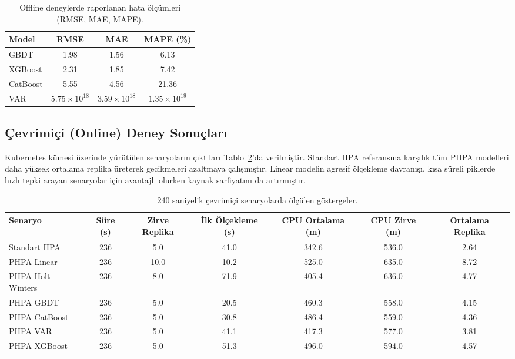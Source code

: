 \documentclass[12pt,a4paper]{article}
\begin{document}
\begin{table}[h]
    \centering
    \caption{Offline deneylerde raporlanan hata ölçümleri (RMSE, MAE, MAPE).}
    \label{tab:offline}
    \begin{tabular}{@{}lccc@{}}
        \toprule
        Model & RMSE & MAE & MAPE (\%) \\
        \midrule
        GBDT & 1.98 & 1.56 & 6.13 \\
        XGBoost & 2.31 & 1.85 & 7.42 \\
        CatBoost & 5.55 & 4.56 & 21.36 \\
        VAR & $5.75\times10^{18}$ & $3.59\times10^{18}$ & $1.35\times10^{19}$ \\
        \bottomrule
    \end{tabular}
\end{table}

\subsection{Çevrimiçi (Online) Deney Sonuçları}
Kubernetes kümesi üzerinde yürütülen senaryoların çıktıları Tablo~\ref{tab:online}’da verilmiştir. Standart HPA referansına karşılık tüm PHPA modelleri daha yüksek ortalama replika üreterek gecikmeleri azaltmaya çalışmıştır. Linear modelin agresif ölçekleme davranışı, kısa süreli piklerde hızlı tepki arayan senaryolar için avantajlı olurken kaynak sarfiyatını da artırmıştır.

\begin{table}[h]
    \centering
    \caption{240 saniyelik çevrimiçi senaryolarda ölçülen göstergeler.}
    \label{tab:online}
    \begin{tabular}{@{}lcccccc@{}}
        \toprule
        Senaryo & Süre (s) & Zirve Replika & İlk Ölçekleme (s) & CPU Ortalama (m) & CPU Zirve (m) & Ortalama Replika \\
        \midrule
        Standart HPA & 236 & 5.0 & 41.0 & 342.6 & 536.0 & 2.64 \\
        PHPA Linear & 236 & 10.0 & 10.2 & 525.0 & 635.0 & 8.72 \\
        PHPA Holt-Winters & 236 & 8.0 & 71.9 & 405.4 & 636.0 & 4.77 \\
        PHPA GBDT & 236 & 5.0 & 20.5 & 460.3 & 558.0 & 4.15 \\
        PHPA CatBoost & 236 & 5.0 & 30.8 & 486.4 & 559.0 & 4.36 \\
        PHPA VAR & 236 & 5.0 & 41.1 & 417.3 & 577.0 & 3.81 \\
        PHPA XGBoost & 236 & 5.0 & 51.3 & 496.0 & 594.0 & 4.57 \\
        \bottomrule
    \end{tabular}
\end{table}
\end{document}
